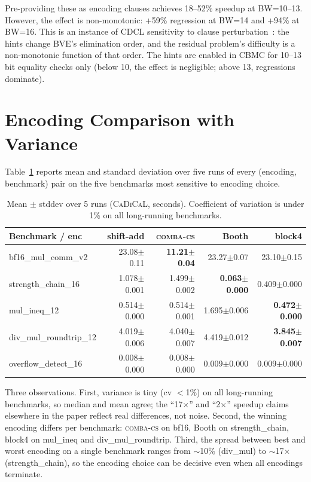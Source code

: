\documentclass[a4paper]{ceurart}
\newcommand{\combacs}{\textsc{comba-cs}\xspace}
\newcommand{\cadical}{\textsc{CaDiCaL}\xspace}
\newcommand{\cbmc}{\textsc{CBMC}\xspace}
\begin{document}
Pre-providing these as encoding clauses achieves 18--52\% speedup at
BW=10--13. However, the effect is non-monotonic: +59\% regression at
BW=14 and +94\% at BW=16. This is an instance of CDCL sensitivity to
clause perturbation~\cite{elffers2018trade}: the hints change BVE's
elimination order, and the residual problem's difficulty is a
non-monotonic function of that order. The hints are enabled in \cbmc
for 10--13 bit equality checks only (below 10, the effect is
negligible; above 13, regressions dominate).


\section{Encoding Comparison with Variance}
\label{app:variance}

Table~\ref{tab:variance} reports mean and standard deviation over
five runs of every (encoding, benchmark) pair on the five benchmarks
most sensitive to encoding choice.

\begin{table}[ht]
\caption{Mean $\pm$ stddev over 5 runs (\cadical, seconds).
  Coefficient of variation is under 1\% on all long-running
  benchmarks.}
\label{tab:variance}
\centering
\small
\begin{tabular}{lrrrr}
\toprule
Benchmark / enc & shift-add & \combacs & Booth & block4 \\
\midrule
bf16\_mul\_comm\_v2 & 23.08$\pm$0.11 & \textbf{11.21$\pm$0.04} & 23.27$\pm$0.07 & 23.10$\pm$0.15 \\
strength\_chain\_16 & 1.078$\pm$0.001 & 1.499$\pm$0.002 & \textbf{0.063$\pm$0.000} & 0.409$\pm$0.000 \\
mul\_ineq\_12 & 0.514$\pm$0.000 & 0.514$\pm$0.001 & 1.695$\pm$0.006 & \textbf{0.472$\pm$0.000} \\
div\_mul\_roundtrip\_12 & 4.019$\pm$0.006 & 4.040$\pm$0.007 & 4.419$\pm$0.012 & \textbf{3.845$\pm$0.007} \\
overflow\_detect\_16 & 0.008$\pm$0.000 & 0.008$\pm$0.000 & 0.009$\pm$0.000 & 0.009$\pm$0.000 \\
\bottomrule
\end{tabular}
\end{table}

Three observations. First, variance is tiny (cv $<$1\%) on all
long-running benchmarks, so median and mean agree; the
``17$\times$'' and ``2$\times$'' speedup claims elsewhere in the
paper reflect real differences, not noise. Second, the winning
encoding differs per benchmark: \combacs on bf16, Booth on
strength\_chain, block4 on mul\_ineq and div\_mul\_roundtrip.
Third, the spread between best and worst encoding on a single
benchmark ranges from ${\sim}$10\% (div\_mul) to ${\sim}$17$\times$
(strength\_chain), so the encoding choice can be decisive even
when all encodings terminate.
\end{document}
